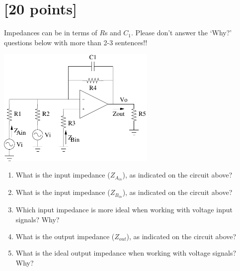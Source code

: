

\section{[20 points]}

Impedances can be in terms of $R$s and $C_1$.  Please don't answer the `Why?' questions below with more than 2-3 sentences!!

\begin{center}
\includegraphics[width=3.0in]{zin_zout}
\end{center}

\begin{enumerate}
\item What is the input impedance ($Z_{A_{in}}$), as indicated on the circuit above?
\vspace*{0.5in}
\item What is the input impedance ($Z_{B_{in}}$), as indicated on the circuit above?
\vspace*{0.5in}
\item Which input impedance is more ideal when working with voltage input signals?  Why?
\vspace*{1.0in}
\item What is the output impedance ($Z_{out}$), as indicated on the circuit above?
\vspace*{0.5in}
\item What is the ideal output impedance when working with voltage signals?  Why?
\end{enumerate}


\clearpage

